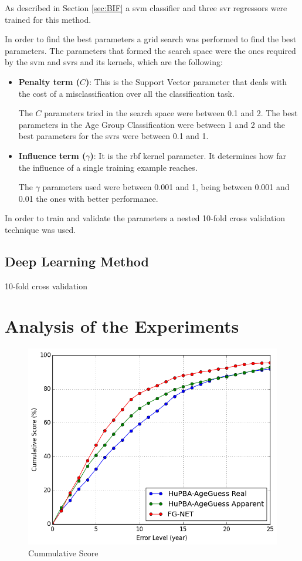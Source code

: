 As described in Section \ref{sec:BIF} a \gls{svm} classifier and three \gls{svr} regressors were trained for this method. 

In order to find the best parameters a grid search was performed to find the best parameters. The parameters that formed the search space were the ones required by the \gls{svm} and \glspl{svr} and its kernels, which are the following:

\begin{itemize}
	\item \textbf{Penalty term ($C$)}: This is the Support Vector parameter that deals with the cost of a misclassification over all the classification task. 
	
	The $C$ parameters tried in the search space were between 0.1 and 2. The best parameters in the Age Group Classification were between 1 and 2 and the best parameters for the \glspl{svr} were between 0.1 and 1.
	
	\item \textbf{Influence term ($\gamma$)}: It is the \gls{rbf} kernel parameter. It determines how far the influence of a single training example reaches.
	
	The $\gamma$ parameters used were between 0.001 and 1, being between 0.001 and 0.01 the ones with better performance.
\end{itemize}

In order to train and validate the parameters a nested 10-fold cross validation technique was used.


\subsection{Deep Learning Method}
10-fold cross validation


\section{Analysis of the Experiments}

\begin{figure}[!h]
	\centering
	\includegraphics[width=\textwidth]{figures/cum_score}
	\caption{Cummulative Score }
	\label{fig:cumS}
\end{figure}
